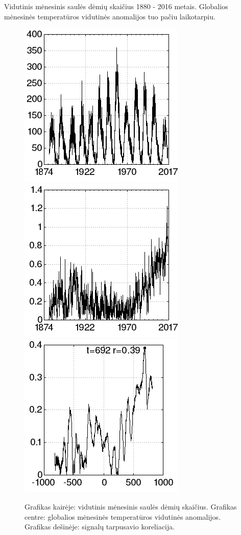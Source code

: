 Vidutinis mėnesinis saulės dėmių skaičius\cite{sunspots} 1880 - 2016 metais.
Globalios mėnesinės temperatūros vidutinės anomalijos\cite{temp} tuo pačiu laikotarpiu.

\begin{figure}
\includegraphics[scale=0.65]{../scripts/sunspots_temperature/sunspots.png}
\includegraphics[scale=0.65]{../scripts/sunspots_temperature/temp.png}
\includegraphics[scale=0.65]{../scripts/sunspots_temperature/result.png}
\caption{Grafikas kairėje: vidutinis mėnesinis saulės dėmių skaičius. Grafikas centre: globalios mėnesinės temperatūros vidutinės anomalijos. Grafikas dešinėje: signalų tarpusavio koreliacija.}
\end{figure}

